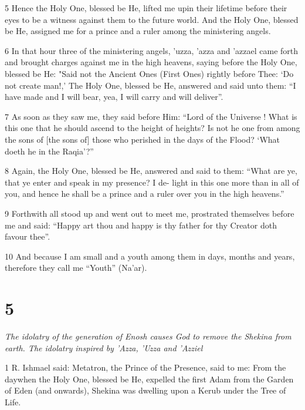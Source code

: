 \par 5 Hence the Holy One, blessed be He, lifted me upin their lifetime before their eyes to be a witness against them to the future world. And the Holy One, blessed be He, assigned me for a prince and a ruler among the ministering angels. 

\par 6 In that hour three of the ministering angels, 'uzza, 'azza and 'azzael came forth and brought charges against me in the high heavens, saying before the Holy One, blessed be He: "Said not the Ancient Ones (First Ones) rightly before Thee: ‘Do not create man!,’ The Holy One, blessed be He, answered and said unto them: “I have made and I will bear, yea, I will carry and will deliver”.

\par 7 As soon as they saw me, they said before Him: “Lord of the Universe ! What is this one that he should ascend to the height of heights? Is not he one from among the sons of [the sons of] those who perished in the days of the Flood? ‘What doeth he in the Raqia’?”

\par 8 Again, the Holy One, blessed be He, answered and said to them: “What are ye, that ye enter and speak in my presence? I de- light in this one more than in all of you, and hence he shall be a prince and a ruler over you in the high heavens.”

\par 9 Forthwith all stood up and went out to meet me, prostrated themselves before me and said: “Happy art thou and happy is thy father for thy Creator doth favour thee”. 

\par 10 And because I am small and a youth among them in days, months and years, therefore they call me “Youth” (Na'ar). 

\chapter{5}

\par \textit{The idolatry of the generation of Enosh causes God to remove the Shekina from earth. The idolatry inspired by 'Azza, 'Uzza and 'Azziel}

\par 1 R. Ishmael said: Metatron, the Prince of the Presence, said to me: From the daywhen the Holy One, blessed be He, expelled the first Adam from the Garden of Eden (and onwards), Shekina was dwelling upon a Kerub under the Tree of Life. 

